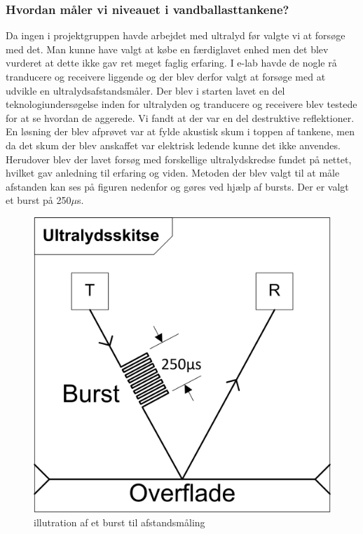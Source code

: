 \subsubsection{Hvordan måler vi niveauet i vandballasttankene?}
Da ingen i projektgruppen havde arbejdet med ultralyd før valgte vi at forsøge med det. Man kunne have valgt at købe en færdiglavet enhed men det blev vurderet at dette ikke gav ret meget faglig erfaring. I e-lab havde de nogle rå tranducere og receivere liggende og der blev derfor valgt at forsøge med at udvikle en ultralydsafstandsmåler. Der blev i starten lavet en del teknologiundersøgelse inden for ultralyden og tranducere og receivere blev testede for at se hvordan de aggerede. Vi fandt at der var en del destruktive reflektioner. En løsning der blev afprøvet var at fylde akustisk skum i toppen af tankene, men da det skum der blev anskaffet var elektrisk ledende kunne det ikke anvendes. Herudover blev der lavet forsøg med forskellige ultralydskredse fundet på nettet, hvilket gav anledning til erfaring og viden. Metoden der blev valgt til at måle afstanden kan ses på figuren nedenfor og gøres ved hjælp af bursts. Der er valgt et burst på 250$\mu$s.
\begin{figure}[H]
\centering
\includegraphics[width=.4\textwidth]{billeder/ultralydsburst}
\caption{illutration af et burst til afstandsmåling}
\end{figure}

